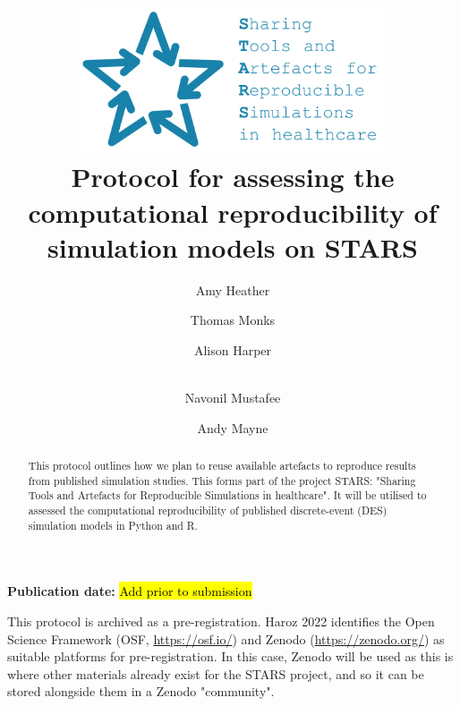 \title{
    \vspace{-1cm}
    \includegraphics[width=9cm]{images/stars_logo_blue_text.png}\\[1cm]
    \textbf{Protocol for assessing the computational reproducibility of simulation models on STARS}
}

\author[1]{ Amy Heather}
\author[1]{ Thomas Monks}
\author[2]{ Alison Harper}
\author[2]{\\  Navonil Mustafee}
\author[3]{ Andy Mayne}


\date{}

\maketitle

\textbf{Publication date:} \hl{Add prior to submission}

\vspace{0.5cm}

\begin{shaded}
    \begin{abstract}
        This protocol outlines how we plan to reuse available artefacts to reproduce results from published simulation studies. This forms part of the project STARS: "Sharing Tools and Artefacts for Reproducible Simulations in healthcare". It will be utilised to assessed the computational reproducibility of published discrete-event (DES) simulation models in Python and R.
    \end{abstract}
\end{shaded}

\vspace{0.5cm}

This protocol is archived as a pre-registration. Haroz 2022 identifies the Open Science Framework (OSF, \url{https://osf.io/}) and Zenodo (\url{https://zenodo.org/}) as suitable platforms for pre-registration.\autocite{haroz_comparison_2022} In this case, Zenodo will be used as this is where other materials already exist for the STARS project, and so it can be stored alongside them in a Zenodo "community".

\newpage
\tableofcontents